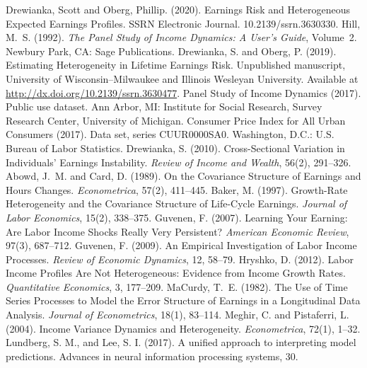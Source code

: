 \documentclass[12pt]{article}
\begin{document}
\begin{thebibliography}{99}
Drewianka, Scott and Oberg, Phillip. (2020). Earnings Risk and Heterogeneous Expected Earnings Profiles. SSRN Electronic Journal. 10.2139/ssrn.3630330.  
 Hill, M.~S. (1992). \textit{The Panel Study of Income Dynamics: A User’s Guide}, Volume~2. Newbury Park, CA: Sage Publications.
 Drewianka, S. and Oberg, P. (2019). Estimating Heterogeneity in Lifetime Earnings Risk. Unpublished manuscript, University of Wisconsin--Milwaukee and Illinois Wesleyan University. Available at \url{http://dx.doi.org/10.2139/ssrn.3630477}.
 Panel Study of Income Dynamics (2017). Public use dataset. Ann Arbor, MI: Institute for Social Research, Survey Research Center, University of Michigan.
 Consumer Price Index for All Urban Consumers (2017). Data set, series CUUR0000SA0. Washington, D.C.: U.S. Bureau of Labor Statistics.
 Drewianka, S. (2010). Cross-Sectional Variation in Individuals’ Earnings Instability. \textit{Review of Income and Wealth}, 56(2), 291--326.
 Abowd, J.~M. and Card, D. (1989). On the Covariance Structure of Earnings and Hours Changes. \textit{Econometrica}, 57(2), 411--445.
 Baker, M. (1997). Growth-Rate Heterogeneity and the Covariance Structure of Life-Cycle Earnings. \textit{Journal of Labor Economics}, 15(2), 338--375.
 Guvenen, F. (2007). Learning Your Earning: Are Labor Income Shocks Really Very Persistent? \textit{American Economic Review}, 97(3), 687--712.
 Guvenen, F. (2009). An Empirical Investigation of Labor Income Processes. \textit{Review of Economic Dynamics}, 12, 58--79.
 Hryshko, D. (2012). Labor Income Profiles Are Not Heterogeneous: Evidence from Income Growth Rates. \textit{Quantitative Economics}, 3, 177--209.
 MaCurdy, T.~E. (1982). The Use of Time Series Processes to Model the Error Structure of Earnings in a Longitudinal Data Analysis. \textit{Journal of Econometrics}, 18(1), 83--114.
 Meghir, C. and Pistaferri, L. (2004). Income Variance Dynamics and Heterogeneity. \textit{Econometrica}, 72(1), 1--32.
 Lundberg, S. M., and Lee, S. I. (2017). A unified approach to interpreting model predictions. Advances in neural information processing systems, 30.




\end{thebibliography}
\end{document}
